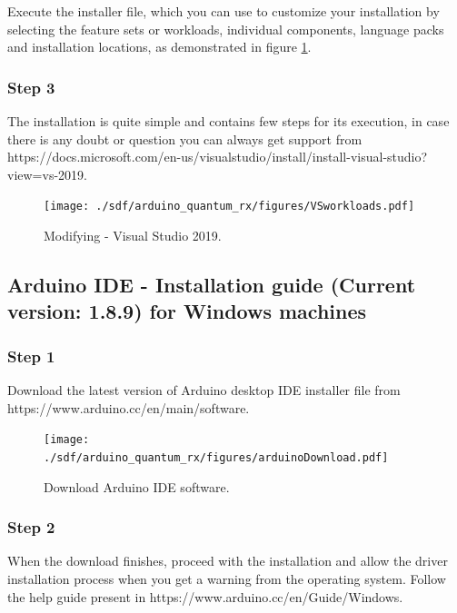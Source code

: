 \begin{refsection}
	Execute the installer file, which you can use to customize your installation by selecting the feature sets or workloads, individual components, language packs and installation locations, as demonstrated in figure \ref{vstudioWorkloads}.
	
	
	
	\subsubsection{Step 3}
	
	The installation is quite simple and contains few steps for its execution, in case there is any doubt or question you can always get support from https://docs.microsoft.com/en-us/visualstudio/install/install-visual-studio?view=vs-2019.
	
	\begin{figure}[H]
		\centering
		\texttt{[image: ./sdf/arduino\_quantum\_rx/figures/VSworkloads.pdf]}
		\caption{Modifying - Visual Studio 2019.}
		\label{vstudioWorkloads}
	\end{figure}
	
	\subsection{Arduino IDE - Installation guide (Current version: 1.8.9) for Windows machines}
	
	\subsubsection{Step 1}
	
	Download the latest version of Arduino desktop IDE installer file from https://www.arduino.cc/en/main/software.
	
	\begin{figure}[H]
		\centering
		\texttt{[image: ./sdf/arduino\_quantum\_rx/figures/arduinoDownload.pdf]}
		\caption{Download Arduino IDE software.}
		\label{arduinoDownload}
	\end{figure}
	
	
	\subsubsection{Step 2}
	
	When the download finishes, proceed with the installation and allow the driver installation process when you get a warning from the operating system. Follow the help guide present in https://www.arduino.cc/en/Guide/Windows.
	

\end{refsection}
